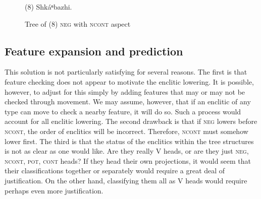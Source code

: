 \documentclass[output=paper]{LSP/langsci}
\begin{document}
\begin{figure}
\caption{Tree of (8) \textsc{neg} with \textsc{ncont} aspect} \label{treeof8}
\begin{center}
(8)	Shk\'aⁿbazhi.	

\end{center}
\end{figure}

\subsection{Feature expansion and prediction}
This solution is not particularly satisfying for several reasons. The first is that feature checking does not appear to motivate the enclitic lowering. It is possible, however, to adjust for this simply by adding features that may or may not be checked through movement. We may assume, however, that if an enclitic of any type can move to check a nearby feature, it will do so. Such a process would account for all enclitic lowering. The second drawback is that if \textsc{neg} lowers before \textsc{ncont}, the order of enclitics will be incorrect. Therefore, \textsc{ncont} must somehow lower first. The third is that the status of the enclitics within the tree structures is not as clear as one would like. Are they really V heads, or are they just \textsc{neg, ncont, pot, cont} heads? If they head their own projections, it would seem that their classifications together or separately would require a great deal of justification. On the other hand, classifying them all as V heads would require perhaps even more justification.
\end{document}
